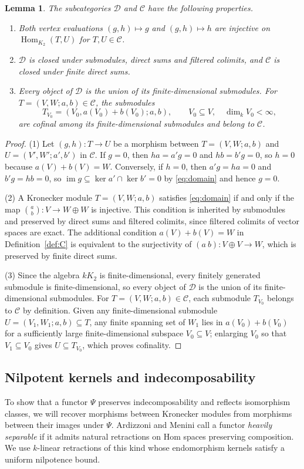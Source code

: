 \documentclass[a4paper,reqno,10pt]{amsart}
\newtheorem{lemma}[theorem]{Lemma}
\theoremstyle{definition}
\DeclareMathOperator{\Hom}{Hom}
\DeclareMathOperator{\im}{im}
\newcommand{\dm}{\dim_k}
\newcommand{\D}{\mathcal D}
\newcommand{\C}{\mathcal C}
\numberwithin{equation}{section}
\begin{document}
\begin{lemma}\label{lem:Kronecker}
The subcategories $\D$ and $\C$ have the following properties.
\begin{enumerate}
\item Both vertex evaluations $(g,h)\mapsto g$ and $(g,h)\mapsto h$ are
injective on $\Hom_{K_2}(T,U)$ for $T,U\in\C$.
\item $\D$ is closed under submodules, direct sums and filtered colimits,
and $\C$ is closed under finite direct sums.
\item Every object of $\D$ is the union of its finite-dimensional
submodules. For $T=(V,W;a,b)\in\C$, the submodules
\[
 T_{V_0}=(V_0,a(V_0)+b(V_0);a,b),\qquad V_0\subseteq V,\quad\dm V_0<\infty,
\]
are cofinal among its finite-dimensional submodules and belong to $\C$.
\end{enumerate}
\end{lemma}
\begin{proof}
(1) Let $(g,h):T\to U$ be a morphism between $T=(V,W;a,b)$ and $U=(V',W';a',b')$ in $\C$. If $g=0$, then $ha=a'g=0$ and $hb=b'g=0$, so $h=0$ because $a(V)+b(V)=W$.
Conversely, if $h=0$, then $a'g=ha=0$ and $b'g=hb=0$, so $\im g\subseteq\ker a'\cap\ker b'=0$ by \eqref{eq:domain} and hence $g=0$.

(2) A Kronecker module $T=(V,W;a,b)$ satisfies \eqref{eq:domain} if and only if
the map $\binom ab:V\to W\oplus W$ is injective. This condition is inherited by submodules and
preserved by direct sums and filtered colimits, since filtered colimits
of vector spaces are exact. The additional condition $a(V)+b(V)=W$ in Definition~\ref{def:C} is equivalent to the
surjectivity of $(a\ b):V\oplus V\to W$, which is preserved by finite
direct sums.

(3) Since the algebra $kK_2$ is finite-dimensional, every finitely generated
submodule is finite-dimensional, so every object of $\D$ is the union of its finite-dimensional submodules. For $T=(V,W;a,b)\in\C$, each submodule $T_{V_0}$ belongs to $\C$ by definition. Given any finite-dimensional submodule $U=(V_1,W_1;a,b)\subseteq T$, any finite spanning set of $W_1$ lies in $a(V_0)+b(V_0)$ for a sufficiently large
finite-dimensional subspace $V_0\subseteq V$; enlarging $V_0$ so that $V_1\subseteq V_0$ gives $U\subseteq T_{V_0}$, which proves cofinality.
\end{proof}

\subsection{Nilpotent kernels and indecomposability}
\label{sec:nilpotent-kernels}
To show that a functor $\Psi$ preserves indecomposability and reflects
isomorphism classes, we will recover morphisms between Kronecker modules
from morphisms between their images under $\Psi$.
Ardizzoni and Menini \cite[Definition~1.1]{ArdizzoniMenini} call a functor
\emph{heavily separable} if it admits natural retractions on Hom spaces
preserving composition. We use $k$-linear retractions of this kind whose
endomorphism kernels satisfy a uniform nilpotence bound.
\end{document}
